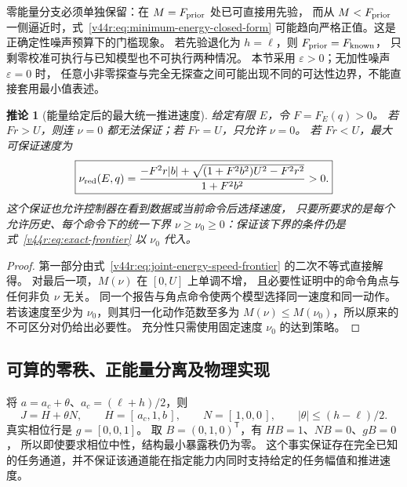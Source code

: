 \documentclass[11pt,a4paper]{article}
\numberwithin{equation}{section}
\newtheorem{corollary}[theorem]{推论}
\theoremstyle{definition}
\begin{document}
零能量分支必须单独保留：在 $M=F_{\rm prior}$ 处已可直接用先验，
而从 $M<F_{\rm prior}$ 一侧逼近时，式~\eqref{v44r:eq:minimum-energy-closed-form}
可能趋向严格正值。这是正确定性噪声预算下的门槛现象。
若先验退化为 $h=\ell$，则 $F_{\rm prior}=F_{\rm known}$，
只剩零校准可执行与已知模型也不可执行两种情况。
本节采用 $\varepsilon>0$；无加性噪声 $\varepsilon=0$ 时，
任意小非零探查与完全无探查之间可能出现不同的可达性边界，不能直接套用最小值表述。

\begin{corollary}[能量给定后的最大统一推进速度]
\label{v44r:cor:uniform-speed}
给定有限 $E$，令 $F=F_E(q)>0$。
若 $Fr>U$，则连 $\nu=0$ 都无法保证；若 $Fr=U$，只允许 $\nu=0$。
若 $Fr<U$，最大可保证速度为
\begin{equation}
 \boxed{
 \nu_{\rm red}(E,q)=
 \frac{-F^2r|b|+
       \sqrt{(1+F^2b^2)U^2-F^2r^2}}
      {1+F^2b^2}>0.}
 \label{v44r:eq:uniform-speed-root}
\end{equation}
这个保证也允许控制器在看到数据或当前命令后选择速度，
只要所要求的是每个允许历史、每个命令下的统一下界
$\nu\ge\nu_0\ge0$：保证该下界的条件仍是
式~\eqref{v44r:eq:exact-frontier} 以 $\nu_0$ 代入。
\end{corollary}

\begin{proof}
第一部分由式~\eqref{v44r:eq:joint-energy-speed-frontier} 的二次不等式直接解得。
对最后一项，$M(\nu)$ 在 $[0,U]$ 上单调不增，
且必要性证明中的命令角点与任何非负 $\nu$ 无关。
同一个报告与角点命令使两个模型选择同一速度和同一动作。
若该速度至少为 $\nu_0$，则其归一化动作范数至多为
$M(\nu)\le M(\nu_0)$，所以原来的不可区分对仍给出必要性。
充分性只需使用固定速度 $\nu_0$ 的达到策略。
\end{proof}

\subsection{可算的零秩、正能量分离及物理实现}

将 $a=a_c+\theta$、$a_c=(\ell+h)/2$，则
\begin{equation}
 J=H+\theta N,
 \qquad H=[\,a_c,1,b\,],\qquad N=[\,1,0,0\,],
 \qquad |\theta|\le(h-\ell)/2.
 \label{v44r:eq:HN-realization}
\end{equation}
真实相位行是 $g=[0,0,1]$。
取 $B=(0,1,0)^\mathsf T$，有 $HB=1$、$NB=0$、$gB=0$，
所以即使要求相位中性，结构最小暴露秩仍为零。
这个事实保证存在完全已知的任务通道，并不保证该通道能在指定能力内同时支持给定的任务幅值和推进速度。
\end{document}

